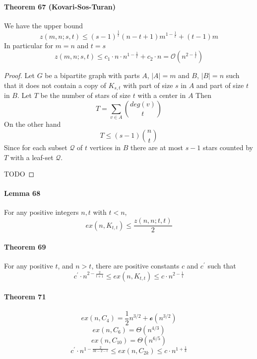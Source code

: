 \paragraph{Theorem 67 (Kovari-Sos-Turan)} We have the upper bound 
$$ z(m,n;s,t) \leq (s - 1)^{\frac{1}{t}}(n-t+1)m^{1-\frac{1}{t}}
+ (t-1)m $$ 
In particular for $ m = n $ and $ t = s $
$$  z(m,n;s,t) \leq c_1 \cdot n \cdot n^{1-\frac{1}{t}} + c_2 \cdot n
= \mathcal{O}(n^{2-\frac{1}{t}}) $$ 
\begin{proof}
    Let $ G $ be a bipartite graph with parts $ A $, $ |A| = m$ and 
    $ B $, $|B| = n $ such that it does not contain a copy of $ K_{s,t} $
    with part of size $ s $ in $ A $ and part of size $ t $ in $ B $.
    Let $ T $ be the number of stars of size $ t $ with a center in $ A $
    Then 
    $$ T = \sum_{v \in A} \binom{deg(v)}{t} $$ 
    On the other hand 
    $$ T \leq (s - 1)\binom{n}{t} $$
    Since for each subset $ \mathcal{Q} $ of $ t $ vertices in $ B $ there 
    are at most $ s-1 $ stars counted by $ T $ with a leaf-set $ \mathcal{Q}$.

    \smallskip TODO
\end{proof}

\paragraph{Lemma 68} For any positive integers $ n,t $ with $ t < n$, 
$$ ex(n,K_{t,t}) \leq \frac{z(n,n;t,t)}{2} $$

\paragraph{Theorem 69} For any positive $ t$, and $ n > t $, there are 
positive constants $ c $ and $ c^\prime $ such that 
$$ c^\prime \cdot n^{2 -\frac{2}{t+1}} \leq ex(n,K_{t,t}) \leq c \cdot n^{2 - \frac{1}{t}} $$

\paragraph{Theorem 71} 
$$ ex(n,C_4) = \frac{1}{2}n^{3/2} + \mathcal{o}(n^{3/2}) $$ 
$$ ex(n,C_6) = \Theta(n^{4/3}) $$
$$ ex(n,C_10) = \Theta(n^{6/5}) $$ 
$$ c^\prime \cdot n^{1-\frac{2}{3k-2-\epsilon}} \leq 
ex(n,C_{2k}) \leq c \cdot n^{1 + \frac{1}{k}} $$ 

